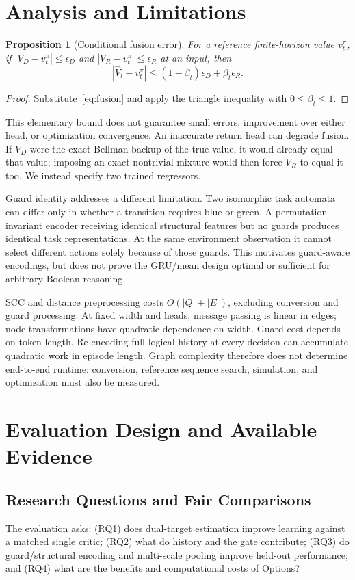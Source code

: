 \documentclass[conference]{IEEEtran}
\newtheorem{proposition}{Proposition}
\begin{document}
\section{Analysis and Limitations}
\label{sec:analysis}
\begin{proposition}[Conditional fusion error]
For a reference finite-horizon value $v_t^\pi$, if
$|V_D-v_t^\pi|\leq\epsilon_D$ and $|V_R-v_t^\pi|\leq\epsilon_R$ at an input, then
\[
|\widehat V_t-v_t^\pi|\leq(1-\beta_t)\epsilon_D+\beta_t\epsilon_R.
\]
\end{proposition}
\begin{proof}
Substitute~\eqref{eq:fusion} and apply the triangle inequality with $0\leq\beta_t\leq1$.
\end{proof}
This elementary bound does not guarantee small errors, improvement over either head, or optimization convergence. An inaccurate return head can degrade fusion. If $V_D$ were the exact Bellman backup of the true value, it would already equal that value; imposing an exact nontrivial mixture would then force $V_R$ to equal it too. We instead specify two trained regressors.

Guard identity addresses a different limitation. Two isomorphic task automata can differ only in whether a transition requires blue or green. A permutation-invariant encoder receiving identical structural features but no guards produces identical task representations. At the same environment observation it cannot select different actions solely because of those guards. This motivates guard-aware encodings, but does not prove the GRU/mean design optimal or sufficient for arbitrary Boolean reasoning.

SCC and distance preprocessing costs $O(|Q|+|E|)$, excluding conversion and guard processing. At fixed width and heads, message passing is linear in edges; node transformations have quadratic dependence on width. Guard cost depends on token length. Re-encoding full logical history at every decision can accumulate quadratic work in episode length. Graph complexity therefore does not determine end-to-end runtime: conversion, reference sequence search, simulation, and optimization must also be measured.


\section{Evaluation Design and Available Evidence}
\label{sec:experiments}
\subsection{Research Questions and Fair Comparisons}
The evaluation asks: (RQ1) does dual-target estimation improve learning against a matched single critic; (RQ2) what do history and the gate contribute; (RQ3) do guard/structural encoding and multi-scale pooling improve held-out performance; and (RQ4) what are the benefits and computational costs of Options?
\end{document}
